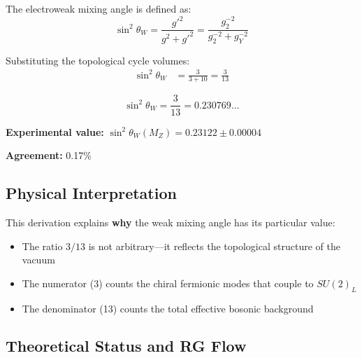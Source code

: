 \documentclass[12pt,a4paper]{article}
\newcommand{\sinW}{\sin^2\theta_W}
\begin{document}
The electroweak mixing angle is defined as:
\begin{equation}
\sinW = \frac{g'^2}{g^2 + g'^2} = \frac{g_2^{-2}}{g_2^{-2} + g_Y^{-2}}
\end{equation}

Substituting the topological cycle volumes:
\begin{align}
\sinW &= \frac{3}{3 + 10} = \frac{3}{13}
\end{align}

\begin{equation}
\boxed{\sinW = \frac{3}{13} = 0.230769...}
\end{equation}

\textbf{Experimental value:} $\sinW(M_Z) = 0.23122 \pm 0.00004$

\textbf{Agreement:} 0.17\%

\subsection{Physical Interpretation}

This derivation explains \textbf{why} the weak mixing angle has its particular value:
\begin{itemize}
    \item The ratio $3/13$ is not arbitrary---it reflects the topological structure of the vacuum
    \item The numerator (3) counts the chiral fermionic modes that couple to $SU(2)_L$
    \item The denominator (13) counts the total effective bosonic background
\end{itemize}

\subsection{Theoretical Status and RG Flow}
\end{document}
